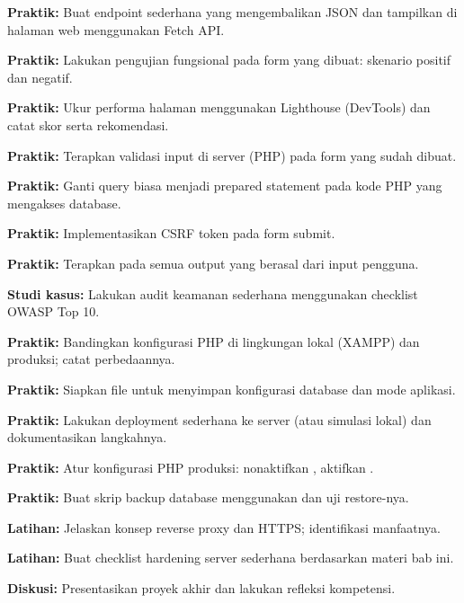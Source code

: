 \documentclass[../main.tex]{subfiles}
\begin{document}
\begin{aktivitas}
  \item \textbf{Praktik:} Buat endpoint sederhana yang mengembalikan JSON dan tampilkan di halaman web menggunakan Fetch API.
  \item \textbf{Praktik:} Lakukan pengujian fungsional pada form yang dibuat: skenario positif dan negatif.
  \item \textbf{Praktik:} Ukur performa halaman menggunakan Lighthouse (DevTools) dan catat skor serta rekomendasi.
  \item \textbf{Praktik:} Terapkan validasi input di server (PHP) pada form yang sudah dibuat.
  \item \textbf{Praktik:} Ganti query biasa menjadi prepared statement pada kode PHP yang mengakses database.
  \item \textbf{Praktik:} Implementasikan CSRF token pada form submit.
  \item \textbf{Praktik:} Terapkan  pada semua output yang berasal dari input pengguna.
  \item \textbf{Studi kasus:} Lakukan audit keamanan sederhana menggunakan checklist OWASP Top 10.
  \item \textbf{Praktik:} Bandingkan konfigurasi PHP di lingkungan lokal (XAMPP) dan produksi; catat perbedaannya.
  \item \textbf{Praktik:} Siapkan file  untuk menyimpan konfigurasi database dan mode aplikasi.
  \item \textbf{Praktik:} Lakukan deployment sederhana ke server (atau simulasi lokal) dan dokumentasikan langkahnya.
  \item \textbf{Praktik:} Atur konfigurasi PHP produksi: nonaktifkan , aktifkan .
  \item \textbf{Praktik:} Buat skrip backup database menggunakan  dan uji restore-nya.
  \item \textbf{Latihan:} Jelaskan konsep reverse proxy dan HTTPS; identifikasi manfaatnya.
  \item \textbf{Latihan:} Buat checklist hardening server sederhana berdasarkan materi bab ini.
  \item \textbf{Diskusi:} Presentasikan proyek akhir dan lakukan refleksi kompetensi.
\end{aktivitas}
\end{document}
